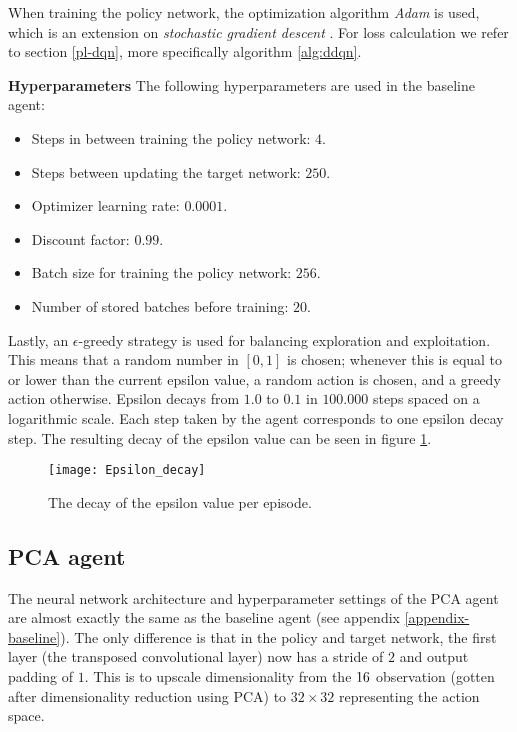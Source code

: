 When training the policy network, the optimization algorithm \emph{Adam} is used, which is an extension on \emph{stochastic gradient descent} \cite{adam}. For loss calculation we refer to section \ref{pl-dqn}, more specifically algorithm \ref{alg:ddqn}.

\noindent\textbf{Hyperparameters}\newline
\noindent The following hyperparameters are used in the baseline agent:
\begin{itemize}
\item Steps in between training the policy network: $4$.
\item Steps between updating the target network: $250$.
\item Optimizer learning rate: $0.0001$.
\item Discount factor: $0.99$.
\item Batch size for training the policy network: $256$.
\item Number of stored batches before training: $20$.
\end{itemize}

Lastly, an $\epsilon$-greedy strategy is used for balancing exploration and exploitation. This means that a random number in $[0,1]$ is chosen; whenever this is equal to or lower than the current epsilon value, a random action is chosen, and a greedy action otherwise. Epsilon decays from $1.0$ to $0.1$ in $100.000$ steps spaced on a logarithmic scale. Each step taken by the agent corresponds to one epsilon decay step. The resulting decay of the epsilon value can be seen in figure \ref{fig:epsilon}.

\begin{figure}[h]
    \centering
    \texttt{[image: Epsilon\_decay]}
    \caption{The decay of the epsilon value per episode.}
    \label{fig:epsilon}
\end{figure}

\subsection{PCA agent}
The neural network architecture and hyperparameter settings of the PCA agent are almost exactly the same as the baseline agent (see appendix \ref{appendix-baseline}). The only difference is that in the policy and target network, the first layer (the transposed convolutional layer) now has a stride of $2$ and output padding of $1$. This is to upscale dimensionality from the $16 \time 16$ observation (gotten after dimensionality reduction using PCA) to $32 \times 32$ representing the action space.


